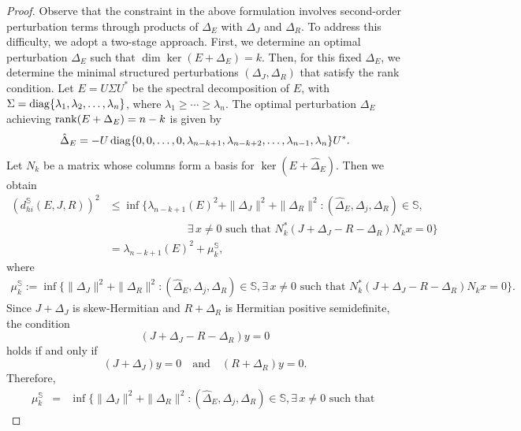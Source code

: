 \documentclass[11pt]{article}
\newcommand{\diag}     {\mathop{\rm diag}\nolimits}
\newcommand{\rank}     {\mathop{\rm rank}\nolimits}
\begin{document}
\begin{proof}
    Observe that the constraint in the above formulation involves second-order perturbation terms through products of $\Delta_E$ with $\Delta_J$ and $\Delta_R$. To address this difficulty, we adopt a two-stage approach. First, we determine an optimal perturbation $\Delta_E$ such that $\dim \ker(E+\Delta_E) = k$. Then, for this fixed $\Delta_E$, we determine the minimal structured perturbations $(\Delta_J,\Delta_R)$ that satisfy the rank condition. Let $E = U \Sigma U^*$ be the spectral decomposition of $E$, with $\Sigma = \diag \{\lambda_1,\lambda_2,\ldots,\lambda_n\}$, where $\lambda_1 \ge \cdots \ge \lambda_n$. The optimal perturbation $\Delta_E$ achieving ${\rank}(E+\Delta_E)=n-k$ is given by
    \[
    \hat \Delta_E = - U \diag\{0,0,\ldots,0,\lambda_{n-k+1},\lambda_{n-k+2}, \ldots,\lambda_{n-1},\lambda_{n}\}U^*.%
    \]
    Let $N_k$ be a  matrix whose columns form a basis for $\ker(E+\hat \Delta_E)$.
    Then we obtain
    \begin{align}\label{Sd:muintro}
        (d_{hi}^{\mathbb S}(E,J,R))^2 &\leq  \inf\Big\{ \lambda_{n-k+1}(E)^2 + \|\Delta_J\|^2 + \|\Delta_R\|^2 : (\hat \Delta_E,\Delta_j,\Delta_R)\in \mathbb S,\nonumber \\ & \hspace{3cm} \exists\, x\neq 0 \text{ such that } N_k^* (J+\Delta_J-R-\Delta_R) N_k x = 0 \Big\}
        \nonumber\\
        &=\lambda_{n-k+1}(E)^2 + \mu_k^{\mathbb S},
    \end{align}
    where
    \begin{eqnarray}\label{hu_hi}
        \mu_k^{\mathbb S}:=\inf\Big\{ \|\Delta_J\|^2 + \|\Delta_R\|^2 : (\hat \Delta_E,\Delta_j,\Delta_R)\in \mathbb S,\exists\, x\neq 0 \text{ such that } N_k^* (J+\Delta_J-R-\Delta_R) N_k x = 0 \Big\}.
    \end{eqnarray}
    Since $J+\Delta_J$ is skew-Hermitian and $R+\Delta_R$ is Hermitian positive semidefinite, the condition
    \[
    (J+\Delta_J - R - \Delta_R)y = 0
    \]
    holds if and only if
    \[
    (J+\Delta_J)y = 0 \quad \text{and} \quad (R+\Delta_R)y = 0.
    \]
    Therefore,
    \begin{eqnarray}\label{eq:temp2}
        \mu_k^{\mathbb S} &= & \inf\Big\{  \|\Delta_J\|^2 + \|\Delta_R\|^2 : (\hat \Delta_E,\Delta_j,\Delta_R)\in \mathbb S, \exists\, x\neq 0 \text{ such that } \nonumber

\end{eqnarray}
\end{proof}
\end{document}
